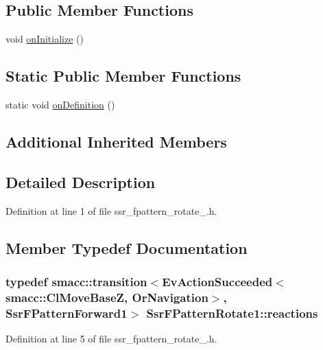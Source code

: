 \subsection*{Public Member Functions}
\begin{DoxyCompactItemize}
\item 
void \hyperlink{structSsrFPatternRotate1_aaf280a67edc0719088176780968dbc01}{on\+Initialize} ()
\end{DoxyCompactItemize}
\subsection*{Static Public Member Functions}
\begin{DoxyCompactItemize}
\item 
static void \hyperlink{structSsrFPatternRotate1_a7c51ce804c50c0a9d87736dd94c1a978}{on\+Definition} ()
\end{DoxyCompactItemize}
\subsection*{Additional Inherited Members}


\subsection{Detailed Description}


Definition at line 1 of file ssr\+\_\+fpattern\+\_\+rotate\+\_.\+h.



\subsection{Member Typedef Documentation}
\subsubsection[{\texorpdfstring{reactions}{reactions}}]{\setlength{\rightskip}{0pt plus 5cm}typedef {\bf smacc\+::transition}$<$Ev\+Action\+Succeeded$<${\bf smacc\+::\+Cl\+Move\+BaseZ}, {\bf Or\+Navigation}$>$, {\bf Ssr\+F\+Pattern\+Forward1}$>$ {\bf Ssr\+F\+Pattern\+Rotate1\+::reactions}}\hypertarget{structSsrFPatternRotate1_a9525313b5aaa3d32678446231617e83e}{}\label{structSsrFPatternRotate1_a9525313b5aaa3d32678446231617e83e}


Definition at line 5 of file ssr\+\_\+fpattern\+\_\+rotate\+\_.\+h.



